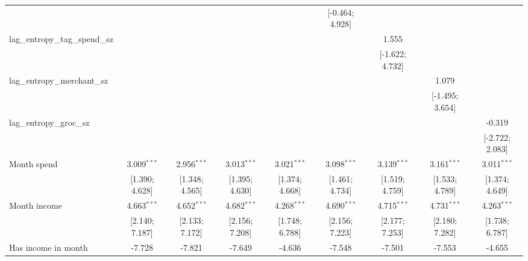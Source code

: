 \begin{table}[htbp]
\begin{threeparttable}[b]
\begin{tabular}{lcccccccc}
                                          &                  &                  &                  &                  & [-0.464; 4.928]  &                  &                  &   \\   
         lag\_entropy\_tag\_spend\_sz     &                  &                  &                  &                  &                  & 1.555            &                  &   \\   
                                          &                  &                  &                  &                  &                  & [-1.622; 4.732]  &                  &   \\   
         lag\_entropy\_merchant\_sz       &                  &                  &                  &                  &                  &                  & 1.079            &   \\   
                                          &                  &                  &                  &                  &                  &                  & [-1.495; 3.654]  &   \\   
         lag\_entropy\_groc\_sz           &                  &                  &                  &                  &                  &                  &                  & -0.319\\   
                                          &                  &                  &                  &                  &                  &                  &                  & [-2.722; 2.083]\\   
         Month spend                      & 3.009$^{***}$    & 2.956$^{***}$    & 3.013$^{***}$    & 3.021$^{***}$    & 3.098$^{***}$    & 3.139$^{***}$    & 3.161$^{***}$    & 3.011$^{***}$\\   
                                          & [1.390; 4.628]   & [1.348; 4.565]   & [1.395; 4.630]   & [1.374; 4.668]   & [1.461; 4.734]   & [1.519; 4.759]   & [1.533; 4.789]   & [1.374; 4.649]\\   
         Month income                     & 4.663$^{***}$    & 4.652$^{***}$    & 4.682$^{***}$    & 4.268$^{***}$    & 4.690$^{***}$    & 4.715$^{***}$    & 4.731$^{***}$    & 4.263$^{***}$\\   
                                          & [2.140; 7.187]   & [2.133; 7.172]   & [2.156; 7.208]   & [1.748; 6.788]   & [2.156; 7.223]   & [2.177; 7.253]   & [2.180; 7.282]   & [1.738; 6.787]\\   
         Has income in month              & -7.728           & -7.821           & -7.649           & -4.636           & -7.548           & -7.501           & -7.553           & -4.655\\   

\end{tabular}
\end{threeparttable}
\end{table}
